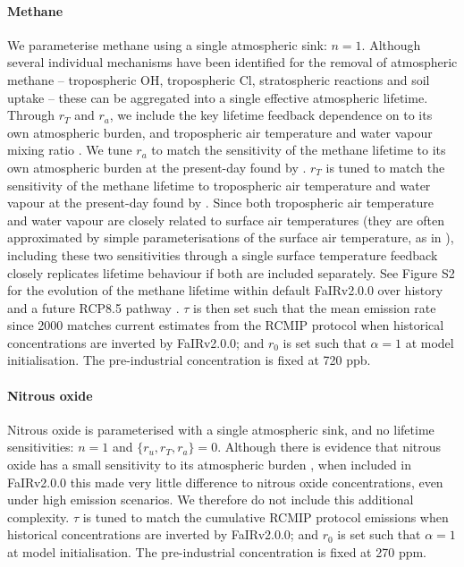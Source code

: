 \documentclass[gmd, manuscript]{copernicus}
\begin{document}
\paragraph*{Methane}
We parameterise methane using a single atmospheric sink: $n=1$. Although several individual mechanisms have been identified for the removal of atmospheric methane -- tropospheric OH, tropospheric Cl, stratospheric reactions and soil uptake \citep{Prather2012,Holmes2013} -- these can be aggregated into a single effective atmospheric lifetime. Through $r_T$ and $r_a$, we include the key lifetime feedback dependence on to its own atmospheric burden, and tropospheric air temperature and water vapour mixing ratio \citep{Holmes2013}. We tune $r_a$ to match the sensitivity of the methane lifetime to its own atmospheric burden at the present-day found by \cite{Holmes2013}. $r_T$ is tuned to match the sensitivity of the methane lifetime to tropospheric air temperature and water vapour at the present-day found by \cite{Holmes2013}. Since both tropospheric air temperature and water vapour are closely related to surface air temperatures (they are often approximated by simple parameterisations of the surface air temperature, as in \citet{Holmes2013}), including these two sensitivities through a single surface temperature feedback closely replicates lifetime behaviour if both are included separately. See Figure S2 for the evolution of the methane lifetime within default FaIRv2.0.0 over history and a future RCP8.5 pathway \citep{Riahi2011}. $\tau$ is then set such that the mean emission rate since 2000 matches current estimates from the RCMIP protocol \citep{Nicholls2019} when historical concentrations \citep{Meinshausen2017} are inverted by FaIRv2.0.0; and $r_0$ is set such that $\alpha=1$ at model initialisation. The pre-industrial concentration is fixed at 720 ppb.
\paragraph*{Nitrous oxide}
Nitrous oxide is parameterised with a single atmospheric sink, and no lifetime sensitivities: $n=1$ and $\{r_u,r_T,r_a\}=0$. Although there is evidence that nitrous oxide has a small sensitivity to its atmospheric burden \citep{Prather2015}, when included in FaIRv2.0.0 this made very little difference to nitrous oxide concentrations, even under high emission scenarios. We therefore do not include this additional complexity. $\tau$ is tuned to match the cumulative RCMIP protocol emissions when historical concentrations are inverted by FaIRv2.0.0; and $r_0$ is set such that $\alpha=1$ at model initialisation. The pre-industrial concentration is fixed at 270 ppm.
\end{document}
